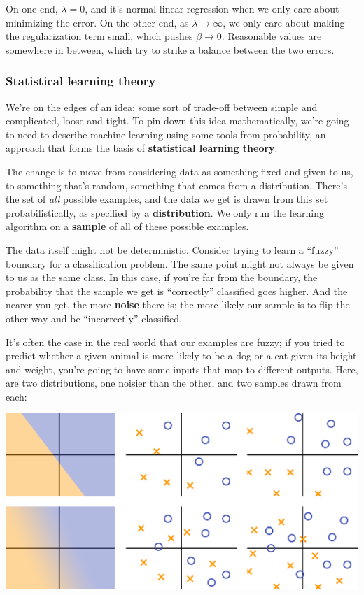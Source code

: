\documentclass[11pt,paper=letter]{scrartcl}
\begin{document}
On one end, $\lambda = 0$, and it's normal linear regression when we only care about minimizing the error. On the other end, as $\lambda \to \infty$, we only care about making the regularization term small, which pushes $\beta \to 0$. Reasonable values are somewhere in between, which try to strike a balance between the two errors.

\subsubsection*{Statistical learning theory}

We're on the edges of an idea: some sort of trade-off between simple and complicated, loose and tight. To pin down this idea mathematically, we're going to need to describe machine learning using some tools from probability, an approach that forms the basis of \textbf{statistical learning theory}.

The change is to move from considering data as something fixed and given to us, to something that's random, something that comes from a distribution. There's the set of \textit{all} possible examples, and the data we get is drawn from this set probabilistically, as specified by a \textbf{distribution}. We only run the learning algorithm on a \textbf{sample} of all of these possible examples.

The data itself might not be deterministic. Consider trying to learn a ``fuzzy'' boundary for a classification problem. The same point might not always be given to us as the same class. In this case, if you're far from the boundary, the probability that the sample we get is ``correctly'' classified goes higher. And the nearer you get, the more \textbf{noise} there is; the more likely our sample is to flip the other way and be ``incorrectly'' classified.

It's often the case in the real world that our examples are fuzzy; if you tried to predict whether a given animal is more likely to be a dog or a cat given its height and weight, you're going to have some inputs that map to different outputs. Here, are two distributions, one noisier than the other, and two samples drawn from each:

\vspace{0.5em}
\begin{center}
  \includegraphics[width=\textwidth]{19.png}
\end{center}
\vspace{0.5em}
\end{document}
